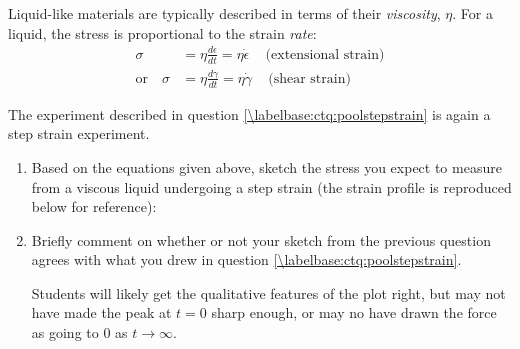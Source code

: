 \begin{activity}
\begin{ctqs}
\begin{enumerate}
		\end{enumerate}
	
\end{ctqs}

\begin{infobox}
	
	Liquid-like materials are typically described in terms of their \emph{viscosity}, $\eta$.  For a liquid, the stress is proportional to the strain \emph{rate}:
	\begin{align*}
		\sigma &= \eta\frac{d\epsilon}{dt}=\eta\dot\epsilon\,\,\,\,\,\,\,\text{(extensional strain)}\\
		\text{or}\,\,\,\,\,\,\sigma &= \eta\frac{d\gamma}{dt}=\eta\dot\gamma\,\,\,\,\,\,\,\text{(shear strain)}
	\end{align*}

\end{infobox}

\begin{ctqs}

	\question The experiment described in question \ref{\labelbase:ctq:poolstepstrain} is again a step strain experiment.
	
		\begin{enumerate}
			\item Based on the equations given above, sketch the stress you expect to measure from a viscous liquid undergoing a step strain (the strain profile is reproduced below for reference):
			
				\begin{solution}[1.5in]
				\end{solution}
				
			\item Briefly comment on whether or not your sketch from the previous question agrees with what you drew in question \ref{\labelbase:ctq:poolstepstrain}.
			
				\begin{solution}[1in]
					Students will likely get the qualitative features of the plot right, but may not have made the peak at $t=0$ sharp enough, or may no have drawn the force as going to $0$ as $t\to\infty$.
				\end{solution}
		\end{enumerate}
\end{ctqs}
	

\begin{model}
\label{\labelbase:mdl:maxwell}


\end{model}
\end{activity}
